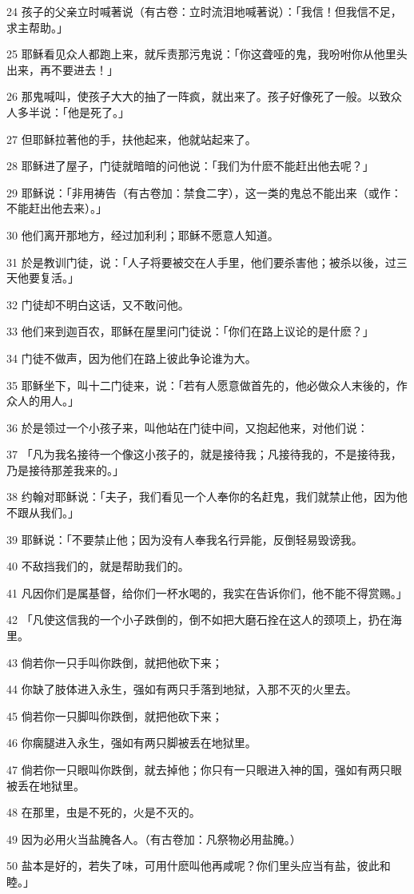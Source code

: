 \par 24 孩子的父亲立时喊著说（有古卷：立时流泪地喊著说）：「我信！但我信不足，求主帮助。」
\par 25 耶稣看见众人都跑上来，就斥责那污鬼说：「你这聋哑的鬼，我吩咐你从他里头出来，再不要进去！」
\par 26 那鬼喊叫，使孩子大大的抽了一阵疯，就出来了。孩子好像死了一般。以致众人多半说：「他是死了。」
\par 27 但耶稣拉著他的手，扶他起来，他就站起来了。
\par 28 耶稣进了屋子，门徒就暗暗的问他说：「我们为什麽不能赶出他去呢？」
\par 29 耶稣说：「非用祷告（有古卷加：禁食二字），这一类的鬼总不能出来（或作：不能赶出他去来）。」
\par 30 他们离开那地方，经过加利利；耶稣不愿意人知道。
\par 31 於是教训门徒，说：「人子将要被交在人手里，他们要杀害他；被杀以後，过三天他要复活。」
\par 32 门徒却不明白这话，又不敢问他。
\par 33 他们来到迦百农，耶稣在屋里问门徒说：「你们在路上议论的是什麽？」
\par 34 门徒不做声，因为他们在路上彼此争论谁为大。
\par 35 耶稣坐下，叫十二门徒来，说：「若有人愿意做首先的，他必做众人末後的，作众人的用人。」
\par 36 於是领过一个小孩子来，叫他站在门徒中间，又抱起他来，对他们说：
\par 37 「凡为我名接待一个像这小孩子的，就是接待我；凡接待我的，不是接待我，乃是接待那差我来的。」
\par 38 约翰对耶稣说：「夫子，我们看见一个人奉你的名赶鬼，我们就禁止他，因为他不跟从我们。」
\par 39 耶稣说：「不要禁止他；因为没有人奉我名行异能，反倒轻易毁谤我。
\par 40 不敌挡我们的，就是帮助我们的。
\par 41 凡因你们是属基督，给你们一杯水喝的，我实在告诉你们，他不能不得赏赐。」
\par 42 「凡使这信我的一个小子跌倒的，倒不如把大磨石拴在这人的颈项上，扔在海里。
\par 43 倘若你一只手叫你跌倒，就把他砍下来；
\par 44 你缺了肢体进入永生，强如有两只手落到地狱，入那不灭的火里去。
\par 45 倘若你一只脚叫你跌倒，就把他砍下来；
\par 46 你瘸腿进入永生，强如有两只脚被丢在地狱里。
\par 47 倘若你一只眼叫你跌倒，就去掉他；你只有一只眼进入神的国，强如有两只眼被丢在地狱里。
\par 48 在那里，虫是不死的，火是不灭的。
\par 49 因为必用火当盐腌各人。（有古卷加：凡祭物必用盐腌。）
\par 50 盐本是好的，若失了味，可用什麽叫他再咸呢？你们里头应当有盐，彼此和睦。」

